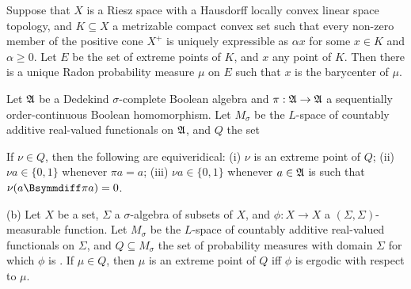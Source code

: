  Suppose that $X$ is a Riesz space with a Hausdorff
locally convex linear space topology, and $K\subseteq X$ a
metrizable compact convex set such that every non-zero member of the
positive cone
$X^+$ is uniquely expressible as $\alpha x$ for some $x\in K$ and
$\alpha\ge 0$.   Let $E$ be the set of extreme points of $K$, and $x$ any
point of $K$.   Then there is a unique Radon
probability measure $\mu$ on $E$ such that $x$ is the barycenter of $\mu$.


Let $\frak A$ be a Dedekind
$\sigma$-complete Boolean algebra and $\pi:\frak A\to\frak A$ a
sequentially order-continuous Boolean
homomorphism.   Let $M_{\sigma}$ be the $L$-space of countably additive
real-valued functionals on $\frak A$, and $Q$ the set


\noindent If $\nu\in Q$, then the following are equiveridical:
(i) $\nu$ is an extreme point of $Q$;  (ii) $\nu a\in\{0,1\}$
whenever $\pi a=a$;  (iii)
$\nu a\in\{0,1\}$ whenever $a\in\frak A$ is such that
$\nu(a\Bsymmdiff\pi a)=0$.

(b) Let $X$ be a set, $\Sigma$ a
$\sigma$-algebra of subsets of $X$, and $\phi:X\to X$ a
$(\Sigma,\Sigma)$-measurable function.   Let $M_{\sigma}$ be the
$L$-space of countably additive real-valued functionals on $\Sigma$, and
$Q\subseteq M_{\sigma}$ the set of probability measures with domain
$\Sigma$ for which $\phi$ is \imp.   If $\mu\in Q$, then $\mu$ is an
extreme point of $Q$ iff $\phi$ is ergodic with respect to
$\mu$.

